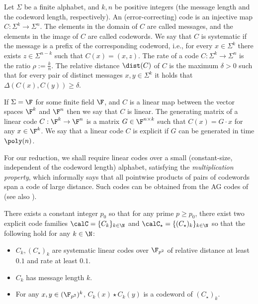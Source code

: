 \documentclass[11pt]{article}
\begin{document}
Let $\Sigma$ be a finite alphabet, and $k, n$ be positive integers (the \textsf{message length} and the
\textsf{codeword length}, respectively). An \textsf{(error-correcting) code} is an injective map $C: \Sigma^k \to \Sigma^n$. The elements in the domain of $C$ are called \textsf{messages}, and the elements in the image of $C$ are called \textsf{codewords}.
We say that $C$ is \textsf{systematic} if the message is a prefix of
the corresponding codeword, i.e., for every $x \in \Sigma^k$ there
exists $z \in \Sigma^{n-k}$ such that $C(x) = (x,z)$.
The \textsf{rate} of a code $C: \Sigma^k \to \Sigma^n$ is the ratio
$\rho := \frac{k} {n}$.  The \textsf{relative distance} $\dist(C)$ of
$C$ is the maximum $\delta >0$ such that for every pair of distinct
messages $x,y\in \Sigma^k$ it holds that $\Delta(C(x),C(y))\ge\delta$.

If $\Sigma=\F$ for some finite field $\F$, and $C$ is a linear map
between the vector spaces $\F^k$ and $\F^n$ then we say that $C$ is
\textsf{linear}. The \textsf{generating matrix} of a linear code
$C: \F^k \to \F^n$ is a matrix $G \in \F^{n \times k}$ such that
$C(x) = G\cdot x$ for any $x\in \F^k$. We say that a linear code $C$ is \textsf{explicit} if 
$G$ can be generated in time $\poly(n)$. 

For our reduction, we shall require linear codes over a small (constant-size, independent of the codeword length) alphabet, satisfying the \emph{multiplication property}, which informally says that all pointwise products of pairs of codewords span a code of large distance. 
Such codes can be obtained from the AG codes of \cite{SAKSD01} (see also \cite[Theorem 2.4]{Rub18}).

\begin{thm}\label{thm:ag}
There exists a constant integer $p_0$ so that for any prime $p \geq p_0$, there exist two explicit code families $\calC=\{C_k\}_{k \in \N}$ and $\calC_{\star}= \{(C_{\star})_k\}_{k \in \N}$ so that the following hold for any $k \in \N$:
\begin{itemize}
\item $C_k, (C_\star)_k$ are  systematic linear codes over $\F_{p^2}$ of  relative distance at least $0.1$ and rate at least $0.1$.
\item $C_k$ has message length $k$.
\item For any $x,y\in (\F_{p^2})^k$, $C_k(x) \star  C_k(y)$ is a codeword of $(C_\star)_k$. 
\end{itemize}
\end{thm}
\end{document}
